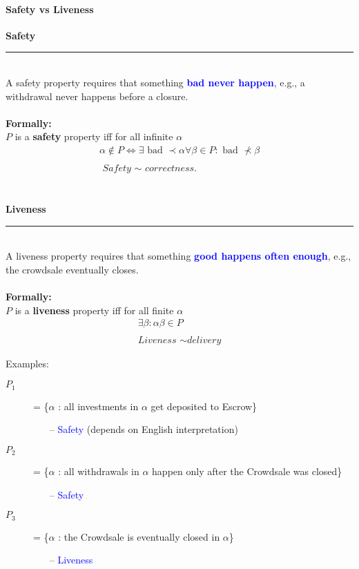 \paragraph{Safety vs Liveness\\}
\begin{multicols}{2}
 \textbf{Safety}  \\ \rule{\linewidth}{0.4pt} \\A safety property requires that something \textbf{\textcolor{blue}{bad never happen}}, e.g., a withdrawal  never happens before a closure. \\ \\ \textbf{Formally:\\}
$P$ is a \textbf{safety} property iff for all infinite $\alpha$
$$
\begin{array}{c}
\alpha \notin P \Leftrightarrow \exists \text { bad } \prec \alpha \forall \beta \in P: \text { bad } \not\prec \beta \\ \\
\textit { Safety } \sim \textit { correctness. }
\end{array}
$$
 \columnbreak 
 \\ \\ \textbf{Liveness}  \\ \rule{\linewidth}{0.4pt}  \\ A liveness property requires that something \textbf{\textcolor{blue}{good happens often enough}}, e.g., the crowdsale eventually closes. \\ \\
\textbf{Formally:}\\
$P$ is a \textbf{liveness} property iff for all finite $\alpha$
$$
\begin{array}{c}
\exists \beta: \alpha \beta \in P \\ \\
\textit {Liveness } \sim \textit {delivery}
\end{array}
$$
\end{multicols}
Examples:
\begin{description}
    \item[$P_1$] = \{$\alpha$ : all investments in $\alpha$ get deposited to Escrow\}
        \begin{enumerate}
            \item[--] \textcolor{blue}{Safety} (depends on English interpretation)
        \end{enumerate}
    \item[$P_2$] = \{$\alpha$ : all withdrawals in $\alpha$ happen only after the Crowdsale was closed\}
    \begin{enumerate}
            \item[--] \textcolor{blue}{Safety}
        \end{enumerate}
    \item[$P_3$] = \{$\alpha$ : the Crowdsale is eventually closed in $\alpha$\}
    \begin{enumerate}
            \item[--] \textcolor{blue}{Liveness}
        \end{enumerate}
\end{description}{}

